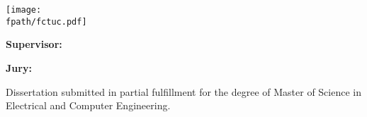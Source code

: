 \renewcommand{\fpath}{C00-Informative/Figures}

\begin{titlepage}
	\begin{center}
		\texttt{[image: \\fpath/fctuc.pdf]}

		\vspace{1cm}
		{\huge{\textbf{\ThesisTitle}}\par}

		\vspace{1cm}
		{\large{\textbf{Supervisor:}\\\SupervisorName\par}}
		\vspace{10mm}

		{\large{\textbf{Jury:}

		\JuryNameI

		\JuryNameII

		\JuryNameIII

		}}

		\vfill
		Dissertation submitted in partial fulfillment for the degree of Master of Science in Electrical and Computer Engineering.

		\vspace{0.5cm}
		{\large \FinishDate\par}


	\end{center}
\end{titlepage}
